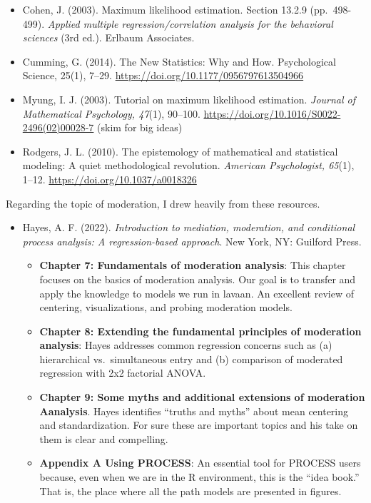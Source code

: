 \documentclass[
  11pt,
]{book}
\providecommand{\tightlist}{%
  \setlength{\itemsep}{0pt}\setlength{\parskip}{0pt}}
\begin{document}
\begin{itemize}
\tightlist
\item
  Cohen, J. (2003). Maximum likelihood estimation. Section 13.2.9 (pp.~498-499). \emph{Applied multiple regression/correlation analysis for the behavioral sciences} (3rd ed.). Erlbaum Associates.
\item
  Cumming, G. (2014). The New Statistics: Why and How. Psychological Science, 25(1), 7--29. \url{https://doi.org/10.1177/0956797613504966}
\item
  Myung, I. J. (2003). Tutorial on maximum likelihood estimation. \emph{Journal of Mathematical Psychology, 47}(1), 90--100. \url{https://doi.org/10.1016/S0022-2496(02)00028-7} (skim for big ideas)
\item
  Rodgers, J. L. (2010). The epistemology of mathematical and statistical modeling: A quiet methodological revolution. \emph{American Psychologist, 65}(1), 1--12. \url{https://doi.org/10.1037/a0018326}
\end{itemize}

Regarding the topic of moderation, I drew heavily from these resources.

\begin{itemize}
\tightlist
\item
  Hayes, A. F. (2022). \emph{Introduction to mediation, moderation, and conditional process analysis: A regression-based approach}. New York, NY: Guilford Press.

  \begin{itemize}
  \tightlist
  \item
    \textbf{Chapter 7: Fundamentals of moderation analysis}: This chapter focuses on the basics of moderation analysis. Our goal is to transfer and apply the knowledge to models we run in lavaan. An excellent review of centering, visualizations, and probing moderation models.
  \item
    \textbf{Chapter 8: Extending the fundamental principles of moderation analysis}: Hayes addresses common regression concerns such as (a) hierarchical vs.~simultaneous entry and (b) comparison of moderated regression with 2x2 factorial ANOVA.
  \item
    \textbf{Chapter 9: Some myths and additional extensions of moderation Aanalysis}. Hayes identifies ``truths and myths'' about mean centering and standardization. For sure these are important topics and his take on them is clear and compelling.
  \item
    \textbf{Appendix A Using PROCESS}: An essential tool for PROCESS users because, even when we are in the R environment, this is the ``idea book.'' That is, the place where all the path models are presented in figures.
  \end{itemize}
\end{itemize}
\end{document}

